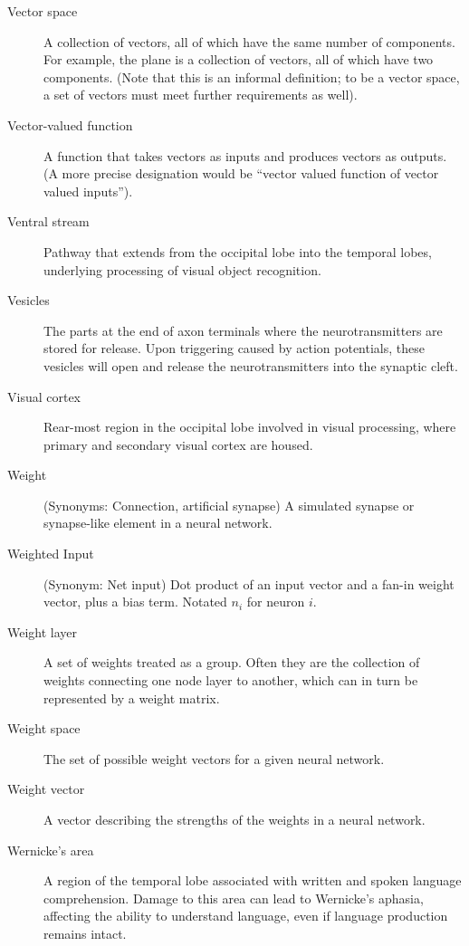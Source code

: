 \begin{description}
\item[Vector space] A collection of vectors, all of which have the same number of components. For example, the plane is a collection of vectors, all of which have two components. (Note that this is an  informal definition; to be a vector space, a set of vectors must meet further requirements as well).

\item[Vector-valued function] A function that takes vectors as inputs and produces vectors as outputs. (A more precise designation would be ``vector valued function of vector valued inputs''). 

\item[Ventral stream] Pathway that extends from the occipital lobe into the temporal lobes, underlying processing of visual object recognition. 

\item[Vesicles] The parts at the end of axon terminals where the neurotransmitters are stored for release. Upon triggering caused by action potentials, these vesicles will open and release the neurotransmitters into the synaptic cleft.

\item[Visual cortex] Rear-most region in the occipital lobe involved in visual processing, where primary and secondary visual cortex are housed.

\item[Weight] (Synonyms: Connection, artificial synapse) A simulated synapse or synapse-like element in a neural network. 

\item[Weighted Input] (Synonym: Net input) Dot product of an input vector and a fan-in weight vector, plus a bias term. Notated $n_i$ for neuron $i$.

\item[Weight layer] A set of weights treated as a group. Often they are the collection of weights connecting one node layer to another, which can in turn be represented by a weight matrix. %

\item[Weight space] The set of possible weight vectors for a given neural network.

\item[Weight vector] A vector describing the strengths of the weights in a neural network.

\item[Wernicke's area] A region of the temporal lobe associated with written and spoken language comprehension. Damage to this area can lead to Wernicke's aphasia, affecting the ability to understand language, even if language production remains intact.


\end{description}
